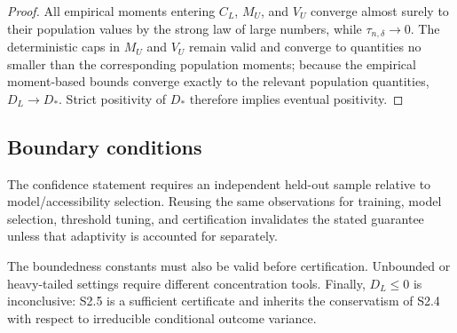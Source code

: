 \begin{proof}
All empirical moments entering $C_L$, $M_U$, and $V_U$ converge almost surely to their population values by the strong law of large numbers, while $\tau_{n,\delta}\to0$. The deterministic caps in $M_U$ and $V_U$ remain valid and converge to quantities no smaller than the corresponding population moments; because the empirical moment-based bounds converge exactly to the relevant population quantities, $D_L\to D_*$. Strict positivity of $D_*$ therefore implies eventual positivity.
\end{proof}

\subsection{Boundary conditions}

The confidence statement requires an independent held-out sample relative to model/accessibility selection. Reusing the same observations for training, model selection, threshold tuning, and certification invalidates the stated guarantee unless that adaptivity is accounted for separately.

The boundedness constants must also be valid before certification. Unbounded or heavy-tailed settings require different concentration tools. Finally, $D_L\le0$ is inconclusive: S2.5 is a sufficient certificate and inherits the conservatism of S2.4 with respect to irreducible conditional outcome variance.
